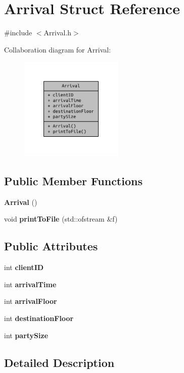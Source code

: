 \section{Arrival Struct Reference}
\label{struct_arrival}


{\ttfamily \#include $<$Arrival.\+h$>$}



Collaboration diagram for Arrival\+:
\nopagebreak
\begin{figure}[H]
\begin{center}
\leavevmode
\includegraphics[width=139pt]{struct_arrival__coll__graph}
\end{center}
\end{figure}
\subsection*{Public Member Functions}
\begin{DoxyCompactItemize}
\item 
{\bf Arrival} ()
\item 
void {\bf print\+To\+File} (std\+::ofstream \&f)
\end{DoxyCompactItemize}
\subsection*{Public Attributes}
\begin{DoxyCompactItemize}
\item 
int {\bf client\+I\+D}
\item 
int {\bf arrival\+Time}
\item 
int {\bf arrival\+Floor}
\item 
int {\bf destination\+Floor}
\item 
int {\bf party\+Size}
\end{DoxyCompactItemize}


\subsection{Detailed Description}


